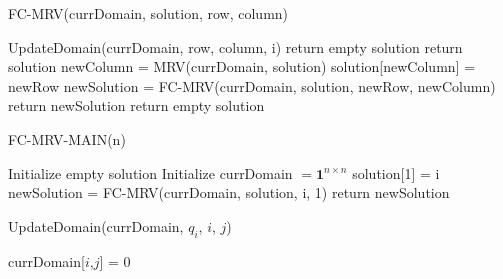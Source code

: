 \begin{algorithm}
\caption{FC-MRV(currDomain, solution, row, column)}\label{alg:fc-mrv}
\begin{algorithmic}[1]
\State UpdateDomain(currDomain, row, column, i)
return empty solution
\EndIf
\EndFor
{}
return solution
\EndIf
\State newColumn = MRV(currDomain, solution)
\State solution[newColumn] = newRow
\State newSolution = FC-MRV(currDomain, solution, newRow, newColumn) 
return newSolution
\EndIf
\EndFor
\State return empty solution
\end{algorithmic}
\end{algorithm}

\begin{algorithm}
\caption{FC-MRV-MAIN(n)}\label{alg:fc-mrv-main}
\begin{algorithmic}[1]
\State Initialize empty solution
\State Initialize currDomain $ = \boldsymbol{1}^{n\times n}$
\State solution[1] = i
\State newSolution = FC-MRV(currDomain, solution, i, 1) 
return newSolution
\EndIf
\EndFor
\end{algorithmic}
\end{algorithm}

\begin{algorithm}
\caption{UpdateDomain(currDomain, $q_i$, $i$, $j$)}\label{alg:UpdateDomain}
\begin{algorithmic}[1]
currDomain[$i$,$j$] = 0
\EndIf
\EndFor
\end{algorithmic}
\end{algorithm}














